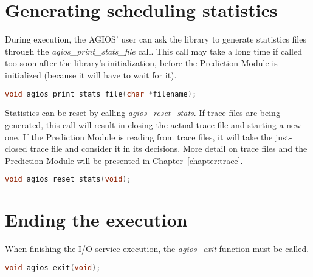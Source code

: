 \section{Generating scheduling statistics}

During execution, the AGIOS' user can ask the library to generate statistics files through the \emph{agios\_print\_stats\_file} call. This call may take a long time if called too soon after the library's initialization, before the Prediction Module is initialized (because it will have to wait for it).

\begin{lstlisting}[language=C]
void agios_print_stats_file(char *filename);
\end{lstlisting}

Statistics can be reset by calling \emph{agios\_reset\_stats}. If trace files are being generated, this call will result in closing the actual trace file and starting a new one. If the Prediction Module is reading from trace files, it will take the just-closed trace file and consider it in its decisions. More detail on trace files and the Prediction Module will be presented in Chapter~\ref{chapter:trace}.

\begin{lstlisting}[language=C]
void agios_reset_stats(void);
\end{lstlisting}

\section{Ending the execution}

When finishing the I/O service execution, the \emph{agios\_exit} function must be called.

\begin{lstlisting}[language=C]
void agios_exit(void);
\end{lstlisting}
